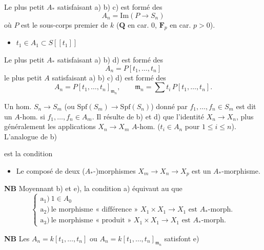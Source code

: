 \documentclass[11pt,a4paper]{article}
\begin{document}
Le plus petit $A_*$ satisfaisant a) b) c) est formé des
\[
  A_n = \mathrm{Im}(P \to S_n)
\]
où $P$ est le sous-corps premier de $k$ ($\mathbf{Q}$ en car. $0$,
$\mathbf{F}_p$ en car. $p > 0$).

\begin{itemize}
  \item[d)] $t_1 \in A_1 \subset S[[t_1]]$
\end{itemize}

Le plus petit $A_*$ satisfaisant a) b) d)  est formé des
\[
  A_n = P[t_1, \ldots, t_n]
\]
\struck{\ill{}}
le plus petit $A$ satisfaisant a) b) c) d) est formé des
\[
  A_n = P[t_1, \ldots, t_n]_{\mathfrak{m}_n}, \qquad
  \mathfrak{m}_n = \sum t_i\, P[t_1, \ldots, t_n].
\]


Un hom. $S_n \to S_m$ (ou $\mathrm{Spf}(S_m) \to \mathrm{Spf}(S_n)$) donné par
$f_1, \ldots, f_n \in S_m$ est dit un $A$-hom. si $f_1, \ldots, f_n \in A_m$. Il
résulte de b) et d) que l'identité $X_n \to X_n$, plus généralement les
applications  $X_n \to X_m$ \ill{}
 $A$-hom. ($t_i \in A_n$ pour $1 \leq i \leq n$). L'analogue
de b)


est la condition

\begin{itemize}
  \item[e)] Le composé de deux ($A_*$-)morphismes $X_m \to X_n \to X_p$ est un
    $A_*$-morphisme.
\end{itemize}


\textbf{NB} Moyennant b) et e), la condition a) équivaut au  que
\[
  \begin{cases}
    \text{a}_1)\ 1 \in A_0 \\
    \text{a}_2)\ \text{le morphisme « différence » } X_1 \times X_1 \to X_1
      \text{ est } A_*\text{-morph.} \\
    \text{a}_3)\ \text{le morphisme « produit » } X_1 \times X_1 \to X_1
      \text{ est } A_*\text{-morph.}
  \end{cases}
\]

\textbf{NB} Les $A_n = k[t_1, \ldots, t_n]$ ou $A_n = k[t_1, \ldots, t_n]_{\mathfrak{m}_n}$
satisfont e)
\end{document}
